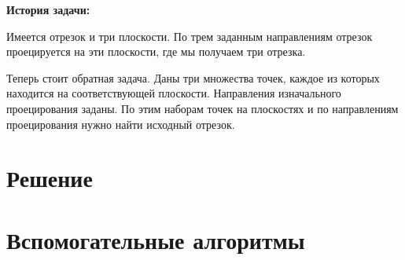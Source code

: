\documentclass[article,final,14pt]{scrreprt}
\begin{document}
\textbf{История задачи:}

Имеется отрезок и три плоскости. По трем заданным направлениям отрезок проецируется на эти плоскости, где мы получаем три отрезка.

Теперь стоит обратная задача. Даны три множества точек, каждое из которых находится на соответствующей плоскости. Направления изначального проецирования заданы. По этим наборам точек на плоскостях и по направлениям проецирования нужно найти исходный отрезок.

\newpage
\chapter{Решение}



% 
% 



\chapter{Вспомогательные алгоритмы}\label{algs}





% 


\end{document}
